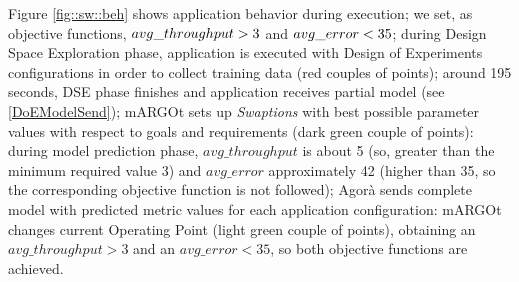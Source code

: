 Figure \ref{fig::sw::beh} shows application behavior during execution; we set, as objective functions, $avg\_\-throughput > 3$ and $avg\_\-error < 35$; during Design Space Exploration phase, application is executed with Design of Experiments configurations in order to collect training data (red couples of points); around 195 seconds, DSE phase finishes and application receives partial model (see \ref{DoEModelSend}); mARGOt sets up \textit{Swaptions} with best possible parameter values with respect to goals and requirements (dark green couple of points): during model prediction phase, $avg\_throughput$ is about 5 (so, greater than the minimum required value 3) and $avg\_error$ approximately 42 (higher than 35, so the corresponding objective function is not followed); Agorà sends complete model with predicted metric values for each application configuration: mARGOt changes current Operating Point (light green couple of points), obtaining an $avg\_throughput > 3$ and an $avg\_error < 35$, so both objective functions are achieved. 
